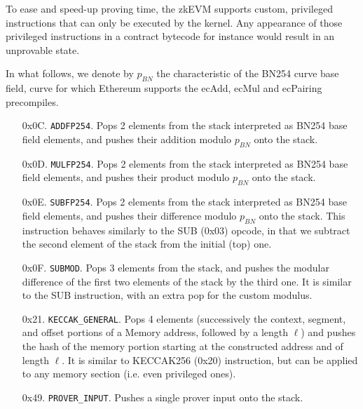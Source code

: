 To ease and speed-up proving time, the zkEVM supports custom, privileged instructions that can only be executed by the kernel.
Any appearance of those privileged instructions in a contract bytecode for instance would result in an unprovable state.

In what follows, we denote by $p_{BN}$ the characteristic of the BN254 curve base field, curve for which Ethereum supports the 
ecAdd, ecMul and ecPairing precompiles.

\begin{enumerate}[align=left]
  \item[0x0C.] \texttt{ADDFP254}. Pops 2 elements from the stack interpreted as BN254 base field elements, and pushes their addition modulo $p_{BN}$ onto the stack.

  \item[0x0D.] \texttt{MULFP254}. Pops 2 elements from the stack interpreted as BN254 base field elements, and pushes their product modulo $p_{BN}$ onto the stack.

  \item[0x0E.] \texttt{SUBFP254}. Pops 2 elements from the stack interpreted as BN254 base field elements, and pushes their difference modulo $p_{BN}$ onto the stack.
  This instruction behaves similarly to the SUB (0x03) opcode, in that we subtract the second element of the stack from the initial (top) one.

  \item[0x0F.] \texttt{SUBMOD}. Pops 3 elements from the stack, and pushes the modular difference of the first two elements of the stack by the third one.
  It is similar to the SUB instruction, with an extra pop for the custom modulus.

  \item[0x21.] \texttt{KECCAK\_GENERAL}. Pops 4 elements (successively the context, segment, and offset portions of a Memory address, followed by a length $\ell$)
  and pushes the hash of the memory portion starting at the constructed address and of length $\ell$. It is similar to KECCAK256 (0x20) instruction, but can be applied to
  any memory section (i.e. even privileged ones).

  \item[0x49.] \texttt{PROVER\_INPUT}. Pushes a single prover input onto the stack.


\end{enumerate}
